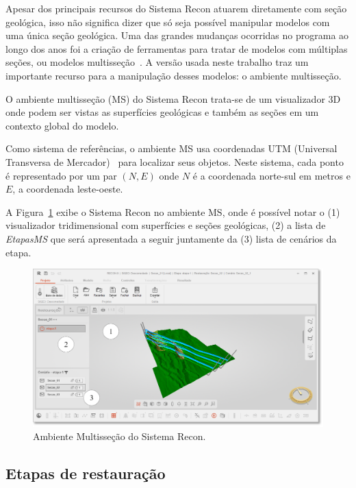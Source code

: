Apesar dos principais recursos do Sistema Recon atuarem diretamente com seção geológica, isso não significa dizer que só seja possível manipular modelos com uma única seção geológica. Uma das grandes mudanças ocorridas no programa ao longo dos anos foi a criação de ferramentas para tratar de modelos com múltiplas seções, ou modelos multisseção~\cite{Felipe, Garcia}. A versão usada neste trabalho traz um importante recurso para a manipulação desses modelos: o ambiente multisseção.

O ambiente multisseção (MS) do Sistema Recon trata-se de um visualizador 3D onde podem ser vistas as superfícies geológicas e também as seções em um contexto global do modelo.

Como sistema de referências, o ambiente MS usa coordenadas UTM (Universal Transversa de Mercador)~\cite{IBGE} para localizar seus objetos. Neste sistema, cada ponto é representado por um par $(N, E)$ onde $N$ é a coordenada norte-sul em metros e $E$, a coordenada leste-oeste.

A Figura~\ref{fig-recon-7} exibe o Sistema Recon no ambiente MS, onde é possível notar o (1) visualizador tridimensional com superfícies e seções geológicas, (2) a lista de \textit{EtapasMS} que será apresentada a seguir juntamente da (3) lista de cenários da etapa.

\begin{figure} [H]
  \begin{center}
    \includegraphics[width=\textwidth]{images/fig-recon-7}
    \caption{Ambiente Multisseção do Sistema Recon.}\label{fig-recon-7}
  \end{center}
\end{figure}

\subsection{Etapas de restauração}\label{step-ms}

